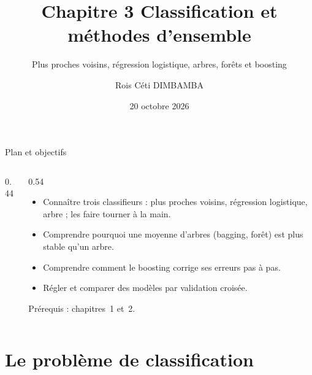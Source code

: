\documentclass[aspectratio=169,11pt]{beamer}
\title{Chapitre 3 \textendash{} Classification et méthodes d'ensemble}
\subtitle{Plus proches voisins, régression logistique, arbres, forêts et boosting}
\author{Rois Céti DIMBAMBA}
\institute{Ingénieur statisticien économiste \textperiodcentered{} Actuaire \textperiodcentered{} \href{https://rdimbamba.shinyapps.io/roisceti_e-cv/}{\textcolor{cnfVert}{CV en ligne}}}
\date{20 octobre 2026}
\begin{document}
\begin{frame}
  \titlepage
\end{frame}

\begin{frame}{Plan et objectifs}
  \begin{columns}[T]
    \begin{column}{0.44\textwidth}
      \footnotesize\tableofcontents
    \end{column}
    \begin{column}{0.54\textwidth}
      \begin{objectifs}
        \footnotesize
        \begin{itemize}
          \item Connaître trois classifieurs : plus proches voisins, régression logistique, arbre ; les faire tourner à la main.
          \item Comprendre pourquoi une moyenne d'arbres (bagging, forêt) est plus stable qu'un arbre.
          \item Comprendre comment le boosting corrige ses erreurs pas à pas.
          \item Régler et comparer des modèles par validation croisée.
        \end{itemize}
      \end{objectifs}
      \vskip-1mm{\scriptsize\color{cnfGris}Prérequis : chapitres~1 et~2.}
    \end{column}
  \end{columns}
\end{frame}

\section{Le problème de classification}
\end{document}
